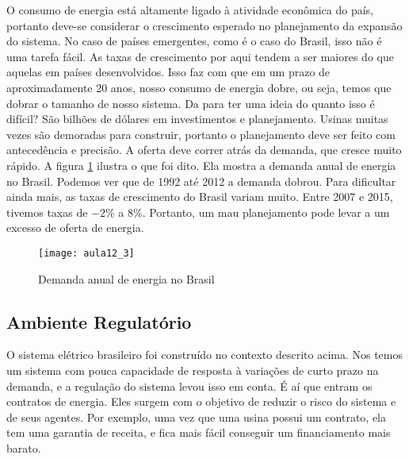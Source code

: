 O consumo de energia está altamente ligado à atividade econômica do país, portanto deve-se considerar o crescimento esperado no planejamento da expansão do sistema. No caso de países emergentes, como é o caso do Brasil, isso não é uma tarefa fácil. As taxas de crescimento por aqui tendem a ser maiores do que aquelas em países desenvolvidos. Isso faz com que em um prazo de aproximadamente 20 anos, nosso consumo de energia dobre, ou seja, temos que dobrar o tamanho de nosso sistema. Da para ter uma ideia do quanto isso é difícil? São bilhões de dólares em investimentos e planejamento. Usinas muitas vezes são demoradas para construir, portanto o planejamento deve ser feito com antecedência e precisão. A oferta deve correr atrás da demanda, que cresce muito rápido. A figura \ref{fig:aula12_3} ilustra o que foi dito. Ela mostra a demanda anual de energia no Brasil. Podemos ver que de 1992 até 2012 a demanda dobrou. Para dificultar ainda mais, as taxas de crescimento do Brasil variam muito. Entre 2007 e 2015, tivemos taxas de $-2\%$ a $8\%$. Portanto, um mau planejamento pode levar a um excesso de oferta de energia.  


\begin{figure}[H]
\begin{centering}
\texttt{[image: aula12\_3]}\protect\caption{\label{fig:aula12_3} Demanda anual de energia no Brasil}
\end{centering}
\end{figure}

\subsection{Ambiente Regulatório}

O sistema elétrico brasileiro foi construído no contexto descrito acima. Nos temos um sistema com pouca capacidade de resposta à variações de curto prazo na demanda, e a regulação do sistema levou isso em conta. É aí que entram os contratos de energia. Eles surgem com o objetivo de reduzir o risco do sistema e de seus agentes. Por exemplo, uma vez que uma usina possui um contrato, ela tem uma garantia de receita, e fica mais fácil conseguir um financiamento mais barato. 

